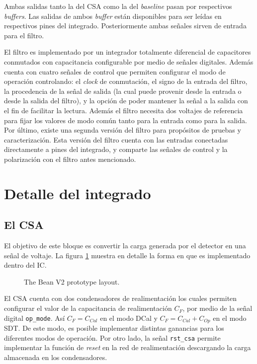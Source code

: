 Ambas salidas tanto la del CSA como la del \textit{baseline} pasan por respectivos \textit{buffers}. Las salidas de ambos \textit{buffer} están disponibles para ser leídas en respectivos pines del integrado. Posteriormente ambas señales sirven de entrada para el filtro.

El filtro es implementado por un integrador totalmente diferencial de capacitores conmutados con capacitancia configurable por medio de señales digitales. Además cuenta con cuatro señales de control que permiten configurar el modo de operación controlando: el \textit{clock} de conmutación, el signo de la entrada del filtro, la procedencia de la señal de salida (la cual puede provenir desde la entrada o desde la salida del filtro), y la opción de poder mantener la señal a la salida con el fin de facilitar la lectura. Además el filtro necesita dos voltajes de referencia para fijar los valores de modo común tanto para la entrada como para la salida.
	Por último, existe una segunda versión del filtro para propósitos de pruebas y caracterización. Esta versión del filtro cuenta con las entradas conectadas directamente a pines del integrado, y comparte las señales de control y la polarización con el filtro antes mencionado.
	
 	
	

\section{Detalle del integrado}
 

\subsection{El CSA}

El objetivo de este bloque es convertir la carga generada por el detector en una señal de voltaje. La figura \ref{csa} muestra en detalle la forma en que es implementado dentro del IC. 

\begin{figure}[!h]
	\centering
	
	\caption{\label{csa}The Bean V2 prototype layout.}
\end{figure}

El CSA cuenta con dos condensadores de realimentación los cuales permiten configurar el valor de la capacitancia de realimentación $C_F$, por medio de la señal digital \verb+op_mode+. Así $C_F= C_{Cal}$ en el modo DCal y $C_F= C_{Cal}+ C_{Op}$ en el modo SDT. De este modo, es posible implementar distintas ganancias para los diferentes modos de operación. Por otro lado, la señal \verb+rst_csa+ permite implementar la función de \textit{reset} en la red de realimentación descargando la carga almacenada en los condensadores.

